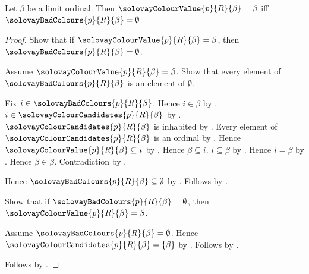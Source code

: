\begin{proposition}\label{solovay_colour_value_eq_sentinel_iff}
    Let $\beta$ be a limit ordinal.
    Then $\solovayColourValue{p}{R}{\beta}=\beta$ iff
        $\solovayBadColours{p}{R}{\beta}=\emptyset$.
\end{proposition}
\begin{proof}
    Show that if $\solovayColourValue{p}{R}{\beta}=\beta$, then
        $\solovayBadColours{p}{R}{\beta}=\emptyset$.
    \begin{subproof}
        Assume $\solovayColourValue{p}{R}{\beta}=\beta$.
        Show that every element of $\solovayBadColours{p}{R}{\beta}$
            is an element of $\emptyset$.
        \begin{subproof}
            Fix $i\in\solovayBadColours{p}{R}{\beta}$.
            Hence $i\in\beta$ by .
            $i\in\solovayColourCandidates{p}{R}{\beta}$
                by .
            $\solovayColourCandidates{p}{R}{\beta}$ is inhabited
                by .
            Every element of $\solovayColourCandidates{p}{R}{\beta}$
                is an ordinal
                by .
            Hence $\solovayColourValue{p}{R}{\beta}\subseteq i$
                by .
            Hence $\beta\subseteq i$.
            $i\subseteq\beta$ by .
            Hence $i=\beta$ by .
            Hence $\beta\in\beta$.
            Contradiction by .
        \end{subproof}
        Hence $\solovayBadColours{p}{R}{\beta}\subseteq\emptyset$
            by .
        Follows by .
    \end{subproof}
    Show that if $\solovayBadColours{p}{R}{\beta}=\emptyset$, then
        $\solovayColourValue{p}{R}{\beta}=\beta$.
    \begin{subproof}
        Assume $\solovayBadColours{p}{R}{\beta}=\emptyset$.
        Hence $\solovayColourCandidates{p}{R}{\beta}=\{\beta\}$
            by .
        Follows by .
    \end{subproof}
    Follows by \auto.
\end{proof}

